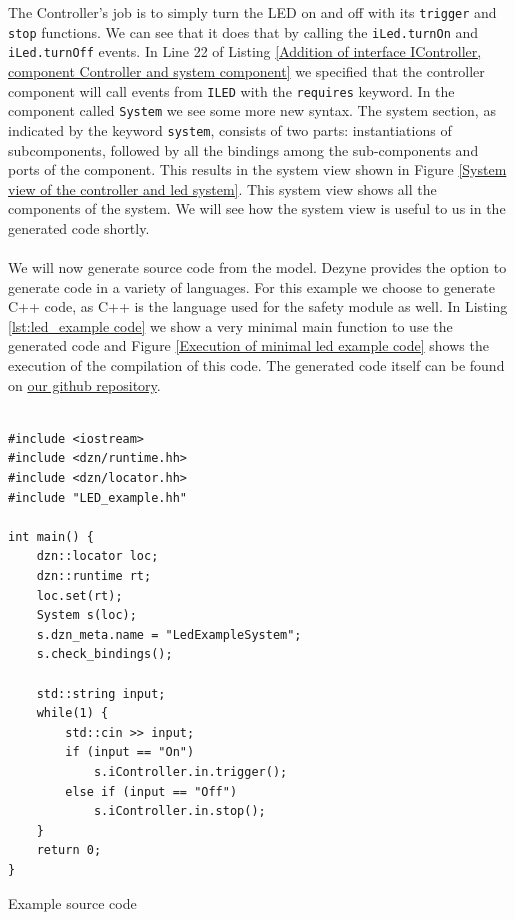 \documentclass[12pt]{scrreprt}
\begin{document}
\begin{appendices}
The Controller's job is to simply turn the LED on and off with its \texttt{trigger} and \texttt{stop} functions. We can see that it does that by calling the \texttt{iLed.turnOn} and \texttt{iLed.turnOff} events. In Line 22 of Listing \ref{Addition of interface IController, component Controller and system component} we specified that the controller component will call events from \texttt{ILED} with the \texttt{requires} keyword. In the component called \texttt{System} we see some more new syntax.  The system section, as indicated by the keyword \texttt{system}, consists of two parts: instantiations of subcomponents, followed by all the bindings among the sub-components and ports of the component. This results in the system view shown in  Figure \ref{System view of the controller and led system}. This system view shows all the components of the system. We will see how the system view is useful to us in the generated code shortly.
\\\\
We will now generate source code from the model. Dezyne provides the option to generate code in a variety of languages. For this example we choose to generate C++ code, as C++ is the language used for the safety module as well. In Listing \ref{lst:led_example code} we show a very minimal main function to use the generated code and Figure \ref{Execution of minimal led example code} shows the execution of the compilation of this code. The generated code itself can be found on \href{https://github.com/Yousousen/safety-module-for-care-robot-rose.git}{our github repository}.

\begin{listing}[ht]
\begin{verbatim}
               
#include <iostream>
#include <dzn/runtime.hh>
#include <dzn/locator.hh>
#include "LED_example.hh"

int main() {
    dzn::locator loc;
    dzn::runtime rt;
    loc.set(rt);
    System s(loc);
    s.dzn_meta.name = "LedExampleSystem";
    s.check_bindings();

    std::string input;
    while(1) {
        std::cin >> input;
        if (input == "On")
            s.iController.in.trigger();
        else if (input == "Off")
            s.iController.in.stop();
    }
    return 0;
}

\end{verbatim}
\caption{Example source code}
\label{lst:led_example code}
\end{listing}


\end{appendices}
\end{document}
